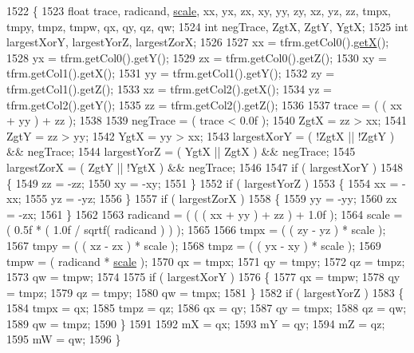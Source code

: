 \begin{DoxyCode}
1522 \{
1523     \textcolor{keywordtype}{float} trace, radicand, \hyperlink{namespaceVectormath_1_1Aos_a6410ede725d953578af2c271eba5b2b0}{scale}, xx, yx, zx, xy, yy, zy, xz, yz, zz, tmpx, tmpy, tmpz, tmpw, qx, qy, 
      qz, qw;
1524     \textcolor{keywordtype}{int} negTrace, ZgtX, ZgtY, YgtX;
1525     \textcolor{keywordtype}{int} largestXorY, largestYorZ, largestZorX;
1526 
1527     xx = tfrm.getCol0().\hyperlink{classVectormath_1_1Aos_1_1Point3_aae02e04a14cd7d4194ca681df958e08f}{getX}();
1528     yx = tfrm.getCol0().getY();
1529     zx = tfrm.getCol0().getZ();
1530     xy = tfrm.getCol1().getX();
1531     yy = tfrm.getCol1().getY();
1532     zy = tfrm.getCol1().getZ();
1533     xz = tfrm.getCol2().getX();
1534     yz = tfrm.getCol2().getY();
1535     zz = tfrm.getCol2().getZ();
1536 
1537     trace = ( ( xx + yy ) + zz );
1538 
1539     negTrace = ( trace < 0.0f );
1540     ZgtX = zz > xx;
1541     ZgtY = zz > yy;
1542     YgtX = yy > xx;
1543     largestXorY = ( !ZgtX || !ZgtY ) && negTrace;
1544     largestYorZ = ( YgtX || ZgtX ) && negTrace;
1545     largestZorX = ( ZgtY || !YgtX ) && negTrace;
1546     
1547     \textcolor{keywordflow}{if} ( largestXorY )
1548     \{
1549         zz = -zz;
1550         xy = -xy;
1551     \}
1552     \textcolor{keywordflow}{if} ( largestYorZ )
1553     \{
1554         xx = -xx;
1555         yz = -yz;
1556     \}
1557     \textcolor{keywordflow}{if} ( largestZorX )
1558     \{
1559         yy = -yy;
1560         zx = -zx;
1561     \}
1562 
1563     radicand = ( ( ( xx + yy ) + zz ) + 1.0f );
1564     scale = ( 0.5f * ( 1.0f / sqrtf( radicand ) ) );
1565 
1566     tmpx = ( ( zy - yz ) * scale );
1567     tmpy = ( ( xz - zx ) * scale );
1568     tmpz = ( ( yx - xy ) * scale );
1569     tmpw = ( radicand * \hyperlink{namespaceVectormath_1_1Aos_a6410ede725d953578af2c271eba5b2b0}{scale} );
1570     qx = tmpx;
1571     qy = tmpy;
1572     qz = tmpz;
1573     qw = tmpw;
1574 
1575     \textcolor{keywordflow}{if} ( largestXorY )
1576     \{
1577         qx = tmpw;
1578         qy = tmpz;
1579         qz = tmpy;
1580         qw = tmpx;
1581     \}
1582     \textcolor{keywordflow}{if} ( largestYorZ )
1583     \{
1584         tmpx = qx;
1585         tmpz = qz;
1586         qx = qy;
1587         qy = tmpx;
1588         qz = qw;
1589         qw = tmpz;
1590     \}
1591 
1592     mX = qx;
1593     mY = qy;
1594     mZ = qz;
1595     mW = qw;
1596 \}
\end{DoxyCode}
